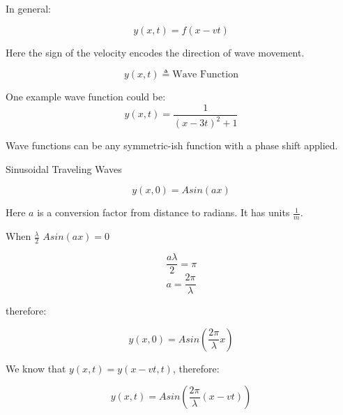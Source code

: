 \documentclass{report}
\begin{document}
\begin{description}
\begin{mdframed}
            In general:

            \begin{displaymath}
                y(x,t) = f(x-vt)
            \end{displaymath}

            Here the sign of the velocity encodes the
            direction of wave movement.

            \begin{displaymath}
                y(x,t) \triangleq \textrm{Wave Function}
            \end{displaymath}
            
            One example wave function could be:
            \begin{displaymath}
                y(x,t) = \frac{1}{(x-3t)^2 + 1}
            \end{displaymath}

            Wave functions can be any symmetric-ish function
            with a phase shift applied.
        \end{mdframed}
        \pagebreak
    \item {\large Sinusoidal Traveling Waves}
        \begin{mdframed}
            
            \begin{displaymath}
                y(x,0) = Asin(ax)
            \end{displaymath}

            Here $a$ is a conversion factor from distance to
            radians. It has units  $\frac{1}{m}$.

            When $\frac{\lambda}{2}$  $A sin(ax) = 0$

            \begin{displaymath}
                \frac{a\lambda}{2} = \pi
            \end{displaymath}
            \begin{displaymath}
                a = \frac{2\pi}{\lambda}
            \end{displaymath}
            
            therefore:

            \begin{displaymath}
                y(x,0) = A sin(\frac{2\pi}{\lambda} x)
            \end{displaymath}
            
            We know that $y(x,t) = y(x-vt, t)$, therefore:

             \begin{displaymath}
                y(x,t) = A sin(\frac{2\pi}{\lambda} (x-vt))
            \end{displaymath}
            
            
        \end{mdframed}
\end{description}
\end{document}
